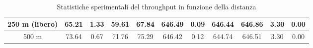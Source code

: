 \documentclass[12pt,a4paper,twoside]{book}
\begin{document}
\begin{table}[H]
\begin{tabular}{|c|c|c|c|c|c|c|c|c|c|c|}
            250 m (libero)    & 65.21                   & 1.33                   & 59.61                  & 67.84                  & 646.49                            & 0.09                             & 646.44                           & 646.86                           & 3.30                & 0.00               \\ \hline
            500 m             & 73.64                   & 0.67                   & 71.76                  & 75.29                  & 646.42                            & 0.12                             & 644.74                           & 646.51                           & 3.30                & 0.00               \\ \hline
        \end{tabular}
        \caption{Statistiche sperimentali del throughput in funzione della distanza}
        \label{tab:T1-throughput_stats-html}
    \end{table}
\else
\end{document}
